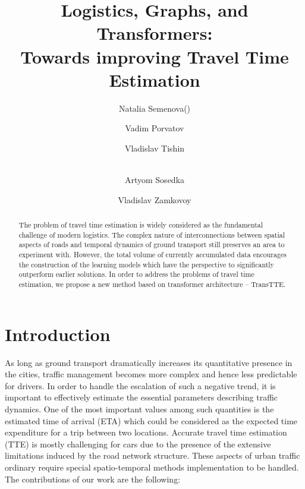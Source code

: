 \documentclass{svproc}
\begin{document}
\mainmatter              \title{Logistics, Graphs, and Transformers: \\
Towards improving Travel Time Estimation
}

\author{Natalia Semenova(\Letter) \and
Vadim Porvatov\and
Vladislav Tishin\and \\
Artyom Sosedka\and 
Vladislav Zamkovoy
}
 

\maketitle          

\begin{abstract}

The problem of travel time estimation is widely considered as the fundamental challenge of modern logistics. The complex nature of interconnections between spatial aspects of roads and temporal dynamics of ground transport still preserves an area to experiment with. However, the total volume of currently accumulated data encourages the construction of the learning models which have the perspective to significantly outperform earlier solutions. In order to address the problems of travel time estimation, we propose a new method based on transformer architecture -- TransTTE. 

\end{abstract}
\section{Introduction}

As long as ground transport dramatically increases its quantitative presence in the cities, traffic management becomes more complex and hence less predictable for drivers. In order to handle the escalation of such a negative trend, it is important to effectively estimate the essential parameters describing traffic dynamics. One of the most important values among such quantities is the estimated time of arrival (ETA) which could be considered as the expected time expenditure for a trip between two locations. Accurate travel time estimation (TTE) is mostly challenging for cars due to the presence of the extensive limitations induced by the road network structure. These aspects of urban traffic ordinary require special spatio-temporal methods implementation to be handled.
The contributions of our work are the following:
\end{document}
